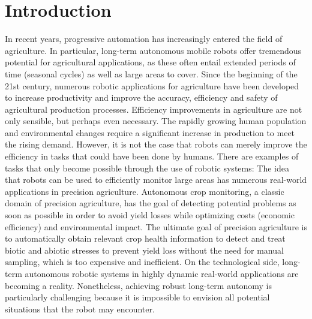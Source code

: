 \documentclass[english, master, utf8]{base/thesis_KBS}
\begin{document}
\cleardoublepage
\tableofcontents

\startTextChapters %

\chapter{Introduction}

In recent years, progressive automation has increasingly entered the field of agriculture. In particular, long-term autonomous mobile robots offer tremendous potential for
agricultural applications, as these often entail extended periods of time (seasonal cycles) as well as large areas to cover. Since the beginning of the 21st century, numerous
robotic applications for agriculture have been developed to increase productivity and improve the accuracy, efficiency and safety of agricultural production processes. \cite{Xue:2010}
Efficiency improvements in agriculture are not only sensible, but perhaps even necessary. The rapidly growing human population and environmental changes require a significant
increase in production to meet the rising demand. \cite{Virlet:2016}\cite{KhakPour:2021}\cite{Roure:2018} However, it is not the case that robots can merely improve the efficiency
in tasks that could have been done by humans. There are examples of tasks that only become possible through the use of robotic systems:  \cite{Ampatzidis:2017} The idea that robots can be used to efficiently monitor
large areas has numerous real-world applications in precision agriculture. \cite{Bargoti:2015} Autonomous crop monitoring, a classic domain of precision agriculture, has the goal of
detecting potential problems as soon as possible in order to avoid yield losses while optimizing costs (economic efficiency) and environmental impact. \cite{Dong:2014}
\cite{Dong:2017} The ultimate goal of precision agriculture is to automatically obtain relevant crop health information to detect and treat biotic and abiotic stresses to prevent
yield loss without the need for manual sampling, which is too expensive and inefficient. \cite{Carlone:2015}\newline
On the technological side, long-term autonomous robotic systems in highly dynamic real-world applications are becoming a reality. \cite{Kunze:2018} Nonetheless, achieving robust
long-term autonomy is particularly challenging because it is impossible to envision all potential situations that the robot may encounter. \cite{Hawes:2017}
\end{document}
